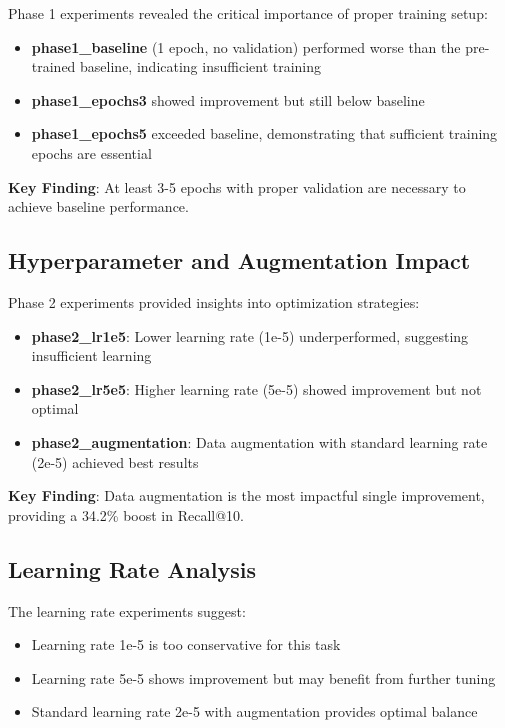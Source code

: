 \documentclass[conference]{IEEEtran}
\begin{document}
Phase 1 experiments revealed the critical importance of proper training setup:
\begin{itemize}
    \item \textbf{phase1\_baseline} (1 epoch, no validation) performed worse than the pre-trained baseline, indicating insufficient training
    \item \textbf{phase1\_epochs3} showed improvement but still below baseline
    \item \textbf{phase1\_epochs5} exceeded baseline, demonstrating that sufficient training epochs are essential
\end{itemize}

\textbf{Key Finding}: At least 3-5 epochs with proper validation are necessary to achieve baseline performance.

\subsection{Hyperparameter and Augmentation Impact}

Phase 2 experiments provided insights into optimization strategies:
\begin{itemize}
    \item \textbf{phase2\_lr1e5}: Lower learning rate (1e-5) underperformed, suggesting insufficient learning
    \item \textbf{phase2\_lr5e5}: Higher learning rate (5e-5) showed improvement but not optimal
    \item \textbf{phase2\_augmentation}: Data augmentation with standard learning rate (2e-5) achieved best results
\end{itemize}

\textbf{Key Finding}: Data augmentation is the most impactful single improvement, providing a 34.2\% boost in Recall@10.

\subsection{Learning Rate Analysis}

The learning rate experiments suggest:
\begin{itemize}
    \item Learning rate 1e-5 is too conservative for this task
    \item Learning rate 5e-5 shows improvement but may benefit from further tuning
    \item Standard learning rate 2e-5 with augmentation provides optimal balance
\end{itemize}
\end{document}

